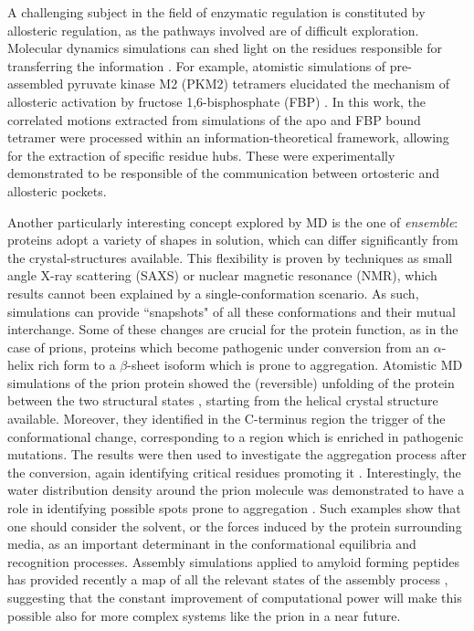 \documentclass[graybox]{svmult}
\begin{document}
A challenging subject in the field of enzymatic regulation is constituted by allosteric regulation, as the pathways involved are of difficult exploration. Molecular dynamics simulations can shed light on the residues responsible for transferring the information \cite{Pandini2012}.
%
For example, atomistic simulations of pre-assembled pyruvate kinase M2 (PKM2) tetramers elucidated the mechanism of allosteric activation by fructose 1,6-bisphosphate (FBP) \cite{Macpherson2019}. In this work, the correlated motions extracted from simulations of the apo and FBP bound tetramer were processed within an information-theoretical framework, allowing for the extraction of specific residue hubs.  These were experimentally demonstrated to be responsible of the communication between ortosteric and allosteric pockets.

Another particularly interesting concept explored by MD is the one of \emph{ensemble}: proteins adopt a variety of shapes in solution, which can differ significantly from the crystal-structures available. This flexibility is proven by techniques as small angle X-ray scattering (SAXS) or nuclear magnetic resonance (NMR), which results cannot been explained by a single-conformation scenario. As such, simulations can provide ``snapshots" of all these conformations and their mutual interchange.
%
Some of these changes are crucial for the protein function, as in the case of prions, proteins which become pathogenic under conversion from an $\alpha$-helix rich form to a $\beta$-sheet isoform which is prone to aggregation. 
Atomistic MD simulations of the prion protein showed the (reversible) unfolding of the protein between the two structural states \cite{Chakroun2013}, starting from the helical crystal structure available. Moreover, they identified in the C-terminus region the trigger of the conformational change, corresponding to a region which is enriched in pathogenic mutations. The results were then used to investigate the aggregation process after the conversion, again identifying critical residues promoting it \cite{Collu2018}. 
Interestingly, the water distribution density around the prion molecule was demonstrated to have a role in identifying possible spots prone to aggregation \cite{DeSimone2005,DeSimone2006}. Such examples show that one should consider the solvent, or the forces induced by the protein surrounding media, as an important determinant in the conformational equilibria and recognition processes.
%
Assembly simulations applied to amyloid forming peptides has provided recently a map of all the relevant states of the assembly process \cite{Sengupta2019}, suggesting that the constant improvement of computational power will make this possible also for more complex systems like the prion in a near future.
\end{document}
